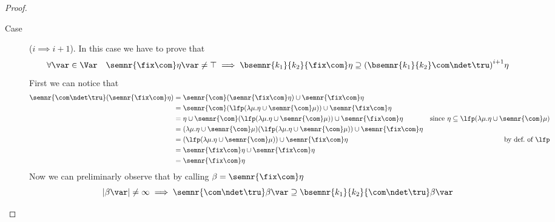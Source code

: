 \begin{proof}
\begin{inductive}
\begin{description}
    \item[Case] (\(i \implies i+1\)). In this case we have to prove
      that
      \begin{equation*}
        \forall \var \in \Var \quad \semnr{\fix\com}\eta\var \neq \top
        \implies
        \bsemnr{k_1}{k_2}{\fix\com}\eta \supseteq {\left(\bsemnr{k_1}{k_2}\com\ndet\tru\right)}^{i+1}\eta
      \end{equation*}
      First we can notice that
      \begin{align*}
        \semnr{\com\ndet\tru}(\semnr{\fix\com}\eta) & = \semnr{\com}(\semnr{\fix\com}\eta) \cup \semnr{\fix\com}\eta \\
                                                    & = \semnr{\com}(\lfp(\lambda \mu . \eta \cup \semnr{\com}\mu)) \cup \semnr{\fix\com}\eta \\
                                                    & = \eta \cup \semnr{\com}(\lfp(\lambda \mu . \eta \cup \semnr{\com}\mu)) \cup \semnr{\fix\com}\eta & \text{since } \eta \subseteq \lfp(\lambda \mu . \eta \cup \semnr{\com}\mu)\\
                                                    & = (\lambda \mu . \eta \cup \semnr{\com}\mu)(\lfp(\lambda \mu . \eta \cup \semnr{\com}\mu)) \cup \semnr{\fix\com}\eta \\
                                                    & = (\lfp(\lambda \mu . \eta \cup \semnr{\com}\mu)) \cup \semnr{\fix\com}\eta & \text{by def.\ of } \lfp\\
                                                    & = \semnr{\fix\com}\eta \cup \semnr{\fix\com}\eta \\
                                                    & = \semnr{\fix\com}\eta
      \end{align*}
      Now we can preliminarly observe that by calling
      \(\beta = \semnr{\fix\com}\eta\)
      \begin{equation}\label{eq:comfixbound}
        |\beta\var| \neq\infty \implies \semnr{\com\ndet\tru}\beta\var \supseteq \bsemnr{k_1}{k_2}{\com\ndet\tru}\beta\var

\end{equation}
\end{description}
\end{inductive}
\end{proof}
